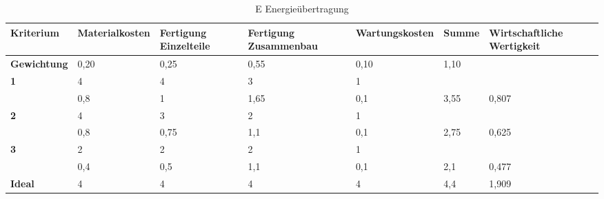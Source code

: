 \documentclass[10pt,a4paper]{article}
\begin{document}
\begin{table}[h!]
    \centering
    \hspace*{0in} %
    \begin{tabular}{>{\bfseries}p{2cm} p{2.2cm} p{2cm} p{2cm} p{2.5cm} p{2cm} p{2cm}}
        \toprule
        Kriterium  & Materialkosten & Fertigung Einzelteile & Fertigung Zusammenbau & Wartungskosten & Summe & Wirtschaftliche Wertigkeit \\
        \midrule
        Gewichtung & 0,20           & 0,25                  & 0,55                  & 0,10           & 1,10  &                            \\
        \midrule
        1          & 4              & 4                     & 3                     & 1              &       &                            \\
                   & 0,8            & 1                     & 1,65                  & 0,1            & 3,55  & 0,807                      \\
        \midrule
        2          & 4              & 3                     & 2                     & 1              &       &                            \\
                   & 0,8            & 0,75                  & 1,1                   & 0,1            & 2,75  & 0,625                      \\
        \midrule
        3          & 2              & 2                     & 2                     & 1              &       &                            \\
                   & 0,4            & 0,5                   & 1,1                   & 0,1            & 2,1   & 0,477                      \\
        \midrule
        Ideal      & 4              & 4                     & 4                     & 4              & 4,4   & 1,909                      \\
        \bottomrule
    \end{tabular}
    \caption{E Energieübertragung}
\end{table}
\end{document}
